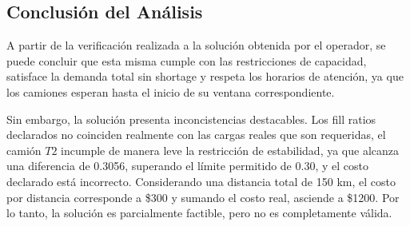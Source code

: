 \subsection{Conclusión del Análisis}

A partir de la verificación realizada a la solución obtenida por el operador, se puede concluir que esta misma cumple con las restricciones de capacidad, satisface la demanda total sin shortage y respeta los horarios de atención, ya que los camiones esperan hasta el inicio de su ventana correspondiente.

Sin embargo, la solución presenta inconcistencias destacables. Los fill ratios declarados no coinciden realmente con las cargas reales que son requeridas, el camión $T2$ incumple de manera leve la restricción de estabilidad, ya que alcanza una diferencia de 0.3056, superando el límite permitido de 0.30, y el costo declarado está incorrecto. Considerando una distancia total de 150 km, el costo por distancia corresponde a \$300 y sumando el costo real, asciende a \$1200. Por lo tanto, la solución es parcialmente factible, pero no es completamente válida.